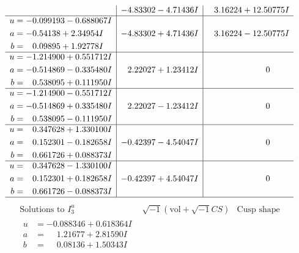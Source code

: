 \documentclass[1p]{elsarticle_modified}
\theoremstyle{definition}
\newcommand{\I}{\sqrt{-1}}
\begin{document}
$$\begin{array}{c|c|c}
 & -4.83302 - 4.71436 I & \phantom{-}3.16224 + 12.50775 I \\ \hline\begin{aligned}
u &= -0.099193 - 0.688067 I \\
a &= -0.54138 + 2.34954 I \\
b &= \phantom{-}0.09895 + 1.92778 I\end{aligned}
 & -4.83302 + 4.71436 I & \phantom{-}3.16224 - 12.50775 I \\ \hline\begin{aligned}
u &= -1.214900 + 0.551712 I \\
a &= -0.514869 - 0.335480 I \\
b &= \phantom{-}0.538095 + 0.111950 I\end{aligned}
 & \phantom{-}2.22027 + 1.23412 I & \phantom{-0.000000 } 0 \\ \hline\begin{aligned}
u &= -1.214900 - 0.551712 I \\
a &= -0.514869 + 0.335480 I \\
b &= \phantom{-}0.538095 - 0.111950 I\end{aligned}
 & \phantom{-}2.22027 - 1.23412 I & \phantom{-0.000000 } 0 \\ \hline\begin{aligned}
u &= \phantom{-}0.347628 + 1.330100 I \\
a &= \phantom{-}0.152301 - 0.182658 I \\
b &= \phantom{-}0.661726 + 0.088373 I\end{aligned}
 & -0.42397 - 4.54047 I & \phantom{-0.000000 } 0 \\ \hline\begin{aligned}
u &= \phantom{-}0.347628 - 1.330100 I \\
a &= \phantom{-}0.152301 + 0.182658 I \\
b &= \phantom{-}0.661726 - 0.088373 I\end{aligned}
 & -0.42397 + 4.54047 I & \phantom{-0.000000 } 0\\
 \hline 
 \end{array}$$\newpage$$\begin{array}{c|c|c}  
\text{Solutions to }I^u_{3}& \I (\text{vol} + \sqrt{-1}CS) & \text{Cusp shape}\\
 \hline 
\begin{aligned}
u &= -0.088346 + 0.618364 I \\
a &= \phantom{-}1.21677 + 2.81590 I \\
b &= \phantom{-}0.08136 + 1.50343 I\end{aligned}

\end{array}$$
\end{document}
